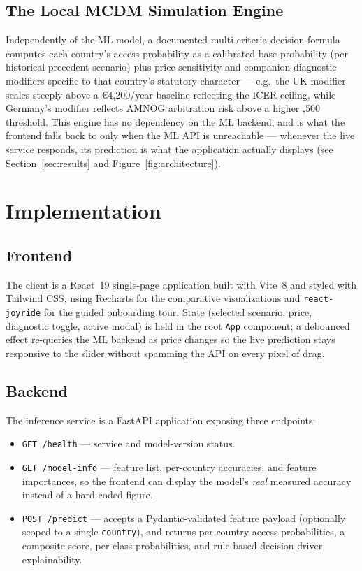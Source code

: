 \documentclass[11pt,a4paper]{article}
\begin{document}
\subsection{The Local MCDM Simulation Engine}
Independently of the ML model, a documented multi-criteria decision formula computes each
country's access probability as a calibrated base probability (per historical precedent scenario)
plus price-sensitivity and companion-diagnostic modifiers specific to that country's statutory
character --- e.g.\ the UK modifier scales steeply above a €4,200/year baseline reflecting the
ICER ceiling, while Germany's modifier reflects AMNOG arbitration risk above a higher
,500 threshold. This engine has no dependency on the ML backend, and is what the frontend
falls back to only when the ML API is unreachable --- whenever the live service responds, its
prediction is what the application actually displays (see Section~\ref{sec:results} and
Figure~\ref{fig:architecture}).

\section{Implementation}

\subsection{Frontend}
The client is a React~19 single-page application built with Vite~8 and styled with Tailwind CSS,
using Recharts for the comparative visualizations and \texttt{react-joyride} for the guided
onboarding tour. State (selected scenario, price, diagnostic toggle, active modal) is held in the
root \texttt{App} component; a debounced effect re-queries the ML backend as price changes so the
live prediction stays responsive to the slider without spamming the API on every pixel of drag.

\subsection{Backend}
The inference service is a FastAPI application exposing three endpoints:
\begin{itemize}[leftmargin=1.3em]
  \item \texttt{GET /health} --- service and model-version status.
  \item \texttt{GET /model-info} --- feature list, per-country accuracies, and feature
  importances, so the frontend can display the model's \emph{real} measured accuracy instead of a
  hard-coded figure.
  \item \texttt{POST /predict} --- accepts a Pydantic-validated feature payload (optionally scoped
  to a single \texttt{country}), and returns per-country access probabilities, a composite score,
  per-class probabilities, and rule-based decision-driver explainability.
\end{itemize}
\end{document}
